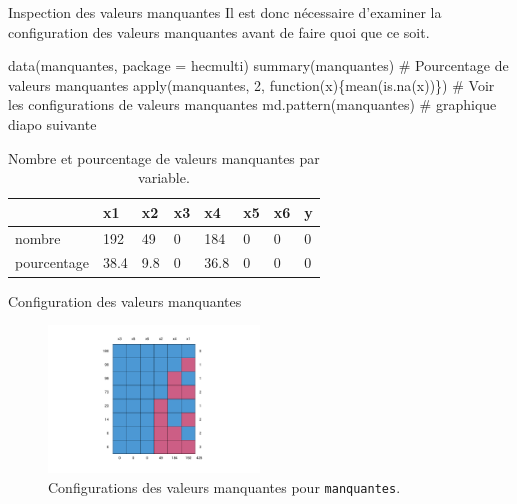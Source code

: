 \documentclass[
  ignorenonframetext,
]{beamer}
\newenvironment{Shaded}{\begin{snugshade}}{\end{snugshade}}
\newcommand{\AttributeTok}[1]{\textcolor[rgb]{0.40,0.45,0.13}{#1}}
\newcommand{\CommentTok}[1]{\textcolor[rgb]{0.37,0.37,0.37}{#1}}
\newcommand{\ControlFlowTok}[1]{\textcolor[rgb]{0.00,0.23,0.31}{#1}}
\newcommand{\DecValTok}[1]{\textcolor[rgb]{0.68,0.00,0.00}{#1}}
\newcommand{\FunctionTok}[1]{\textcolor[rgb]{0.28,0.35,0.67}{#1}}
\newcommand{\NormalTok}[1]{\textcolor[rgb]{0.00,0.23,0.31}{#1}}
\newcommand{\StringTok}[1]{\textcolor[rgb]{0.13,0.47,0.30}{#1}}
\begin{document}
\begin{frame}[fragile]{Inspection des valeurs manquantes}
\protect\hypertarget{inspection-des-valeurs-manquantes}{}
Il est donc nécessaire d'examiner la configuration des valeurs
manquantes avant de faire quoi que ce soit.

\begin{Shaded}
\begin{Highlighting}[numbers=left,,]
\FunctionTok{data}\NormalTok{(manquantes, }\AttributeTok{package =} \StringTok{\textquotesingle{}hecmulti\textquotesingle{}}\NormalTok{)}
\FunctionTok{summary}\NormalTok{(manquantes)}
\CommentTok{\# Pourcentage de valeurs manquantes}
\FunctionTok{apply}\NormalTok{(manquantes, }\DecValTok{2}\NormalTok{, }\ControlFlowTok{function}\NormalTok{(x)\{}\FunctionTok{mean}\NormalTok{(}\FunctionTok{is.na}\NormalTok{(x))\})}
\CommentTok{\# Voir les configurations de valeurs manquantes}
\FunctionTok{md.pattern}\NormalTok{(manquantes) }\CommentTok{\# graphique diapo suivante}
\end{Highlighting}
\end{Shaded}

\hypertarget{tbl-manquantes-univ}{}
\begin{table}
\caption{\label{tbl-manquantes-univ}Nombre et pourcentage de valeurs manquantes par variable. }\tabularnewline

\centering
\begin{tabular}{llllllll}
\toprule
  & x1 & x2 & x3 & x4 & x5 & x6 & y\\
\midrule
nombre & 192 & 49 & 0 & 184 & 0 & 0 & 0\\
pourcentage & 38.4 & 9.8 & 0 & 36.8 & 0 & 0 & 0\\
\bottomrule
\end{tabular}
\end{table}
\end{frame}

\begin{frame}[fragile]{Configuration des valeurs manquantes}
\protect\hypertarget{configuration-des-valeurs-manquantes}{}
\begin{figure}

{\centering \includegraphics[width=0.5\textwidth,height=\textheight]{MATH60602-diapos13_files/figure-beamer/fig-manquantes2-1.pdf}

}

\caption{\label{fig-manquantes2}Configurations des valeurs manquantes
pour \texttt{manquantes}.}

\end{figure}
\end{frame}
\end{document}
